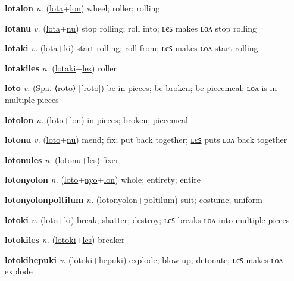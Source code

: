 \textbf{\hypertarget{lotalon}{lotalon}} \textit{n.} (\hyperlink{lota}{lota}+\allowbreak \hyperlink{lon}{lon})
wheel; roller; rolling

\textbf{\hypertarget{lotanu}{lotanu}} \textit{v.} (\hyperlink{lota}{lota}+\allowbreak \hyperlink{nu}{nu})
stop rolling; roll into; ʟєꜱ makes ʟᴏᴧ stop rolling

\textbf{\hypertarget{lotaki}{lotaki}} \textit{v.} (\hyperlink{lota}{lota}+\allowbreak \hyperlink{ki}{ki})
start rolling; roll from; \hyperlink{lotakiles}{ʟєꜱ} makes ʟᴏᴧ start rolling

\textbf{\hypertarget{lotakiles}{lotakiles}} \textit{n.} (\hyperlink{lotaki}{lotaki}+\allowbreak \hyperlink{les}{les})
roller

\textbf{\hypertarget{loto}{loto}} \textit{v.} (Spa. ⟨roto⟩ [ˈroto])
be in pieces; be broken; be piecemeal; \hyperlink{lotolon}{ʟᴏᴧ} is in multiple pieces

\textbf{\hypertarget{lotolon}{lotolon}} \textit{n.} (\hyperlink{loto}{loto}+\allowbreak \hyperlink{lon}{lon})
in pieces; broken; piecemeal

\textbf{\hypertarget{lotonu}{lotonu}} \textit{v.} (\hyperlink{loto}{loto}+\allowbreak \hyperlink{nu}{nu})
mend; fix; put back together; \hyperlink{lotonules}{ʟєꜱ} puts ʟᴏᴧ back together

\textbf{\hypertarget{lotonules}{lotonules}} \textit{n.} (\hyperlink{lotonu}{lotonu}+\allowbreak \hyperlink{les}{les})
fixer

\textbf{\hypertarget{lotonyolon}{lotonyolon}} \textit{n.} (\hyperlink{loto}{loto}+\allowbreak \hyperlink{nyo}{nyo}+\allowbreak \hyperlink{lon}{lon})
whole; entirety; entire

\textbf{\hypertarget{lotonyolonpoltilum}{lotonyolonpoltilum}} \textit{n.} (\hyperlink{lotonyolon}{lotonyolon}+\allowbreak \hyperlink{poltilum}{poltilum})
suit; costume; uniform

\textbf{\hypertarget{lotoki}{lotoki}} \textit{v.} (\hyperlink{loto}{loto}+\allowbreak \hyperlink{ki}{ki})
break; shatter; destroy; \hyperlink{lotokiles}{ʟєꜱ} breaks ʟᴏᴧ into multiple pieces

\textbf{\hypertarget{lotokiles}{lotokiles}} \textit{n.} (\hyperlink{lotoki}{lotoki}+\allowbreak \hyperlink{les}{les})
breaker

\textbf{\hypertarget{lotokihepuki}{lotokihepuki}} \textit{v.} (\hyperlink{lotoki}{lotoki}+\allowbreak \hyperlink{hepuki}{hepuki})
explode; blow up; detonate; \hyperlink{lotokihepukiles}{ʟєꜱ} makes \hyperlink{lotokihepukilon}{ʟᴏᴧ} explode

